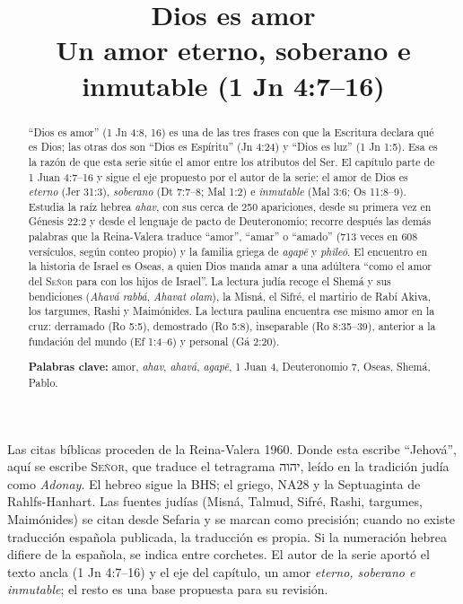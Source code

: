 \documentclass[11pt,letterpaper]{article}
\title{\color{azul}\bfseries Dios es amor\\[4pt]\large\color{gris}\mdseries Un amor eterno, soberano e inmutable (1 Jn 4:7--16)}
\author{}\date{}
\newcommand{\heb}[1]{\mbox{\foreignlanguage{hebrew}{#1}}}
\newcommand{\SENOR}{\textsc{Señor}}
\begin{document}
\maketitle\thispagestyle{empty}

\begin{abstract}\noindent
``Dios es amor'' (1 Jn 4:8, 16) es una de las tres frases con que la Escritura declara qué es Dios; las otras dos son ``Dios es Espíritu'' (Jn 4:24) y ``Dios es luz'' (1 Jn 1:5). Esa es la razón de que esta serie sitúe el amor entre los atributos del Ser. El capítulo parte de 1 Juan 4:7--16 y sigue el eje propuesto por el autor de la serie: el amor de Dios es \emph{eterno} (Jer 31:3), \emph{soberano} (Dt 7:7--8; Mal 1:2) e \emph{inmutable} (Mal 3:6; Os 11:8--9). Estudia la raíz hebrea \emph{ahav}, con sus cerca de 250 apariciones, desde su primera vez en Génesis 22:2 y desde el lenguaje de pacto de Deuteronomio; recorre después las demás palabras que la Reina-Valera traduce ``amor'', ``amar'' o ``amado'' (713 veces en 608 versículos, según conteo propio) y la familia griega de \emph{agapē} y \emph{phileō}. El encuentro en la historia de Israel es Oseas, a quien Dios manda amar a una adúltera ``como el amor del \SENOR{} para con los hijos de Israel''. La lectura judía recoge el Shemá y sus bendiciones (\emph{Ahavá rabbá}, \emph{Ahavat olam}), la Misná, el Sifré, el martirio de Rabí Akiva, los targumes, Rashi y Maimónides. La lectura paulina encuentra ese mismo amor en la cruz: derramado (Ro 5:5), demostrado (Ro 5:8), inseparable (Ro 8:35--39), anterior a la fundación del mundo (Ef 1:4--6) y personal (Gá 2:20).
\par\smallskip\noindent\textbf{Palabras clave:} amor, \emph{ahav}, \emph{ahavá}, \emph{agapē}, 1 Juan 4, Deuteronomio 7, Oseas, Shemá, Pablo.\end{abstract}

\begin{nota}
Las citas bíblicas proceden de la Reina-Valera 1960. Donde esta escribe ``Jehová'', aquí se escribe \SENOR, que traduce el tetragrama \heb{יהוה}, leído en la tradición judía como \emph{Adonay}. El hebreo sigue la BHS; el griego, NA28 y la Septuaginta de Rahlfs-Hanhart. Las fuentes judías (Misná, Talmud, Sifré, Rashi, targumes, Maimónides) se citan desde Sefaria y se marcan como precisión; cuando no existe traducción española publicada, la traducción es propia. Si la numeración hebrea difiere de la española, se indica entre corchetes. El autor de la serie aportó el texto ancla (1 Jn 4:7--16) y el eje del capítulo, un amor \emph{eterno, soberano e inmutable}; el resto es una base propuesta para su revisión.
\end{nota}
\end{document}

